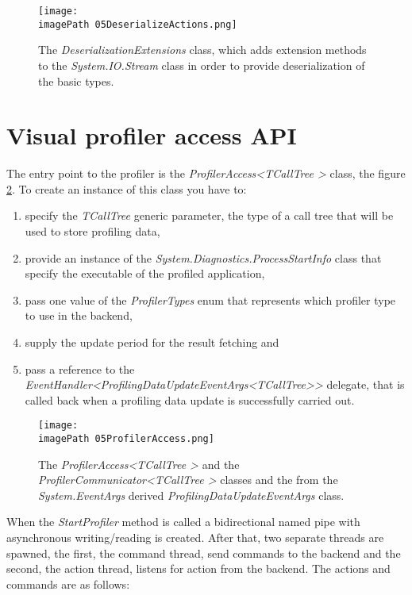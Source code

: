 \begin{figure}
	\centering
		\texttt{[image: \\imagePath 05DeserializeActions.png]}
		\caption{The \textit{DeserializationExtensions} class, which adds extension methods to the \textit{System.IO.Stream} class in order to provide deserialization of the basic types. }
	\label{fig:05DeserializeActions}
\end{figure}

\section{Visual profiler access API}
The entry point to the profiler is the \textit{ProfilerAccess\textless TCallTree \textgreater} class, the figure \ref{fig:05ProfilerAccess}. To create an instance of this class you have to:
\begin{enumerate}

\item specify the \textit{TCallTree} generic parameter, the type of a call tree that will be used to store profiling data,

\item provide an instance of the \textit{System.Diagnostics.ProcessStartInfo} class that specify the executable of the profiled application,

\item pass one value of the \textit{ProfilerTypes} enum that represents which profiler type to use in the backend,

\item supply the update period for the result fetching and

\item pass a reference to the \textit{EventHandler\textless ProfilingDataUpdateEventArgs\textless TCallTree\textgreater\textgreater} delegate, that is called back when a profiling data update is successfully carried out.
 
\end{enumerate}
\begin{figure}
	\centering
		\texttt{[image: \\imagePath 05ProfilerAccess.png]}
		\caption{The \textit{ProfilerAccess\textless TCallTree \textgreater} and
the \textit{ProfilerCommunicator\textless TCallTree \textgreater} 		
		 classes and the from the \textit{System.EventArgs} derived \textit{ProfilingDataUpdateEventArgs} class. }
	\label{fig:05ProfilerAccess}
\end{figure}

When the \textit{StartProfiler} method is called a bidirectional named pipe with asynchronous writing/reading is created. After that, two separate threads are spawned, the first, the command thread, send commands to the backend and the second, the action thread, listens for action from the backend. The actions and commands are as follows:

